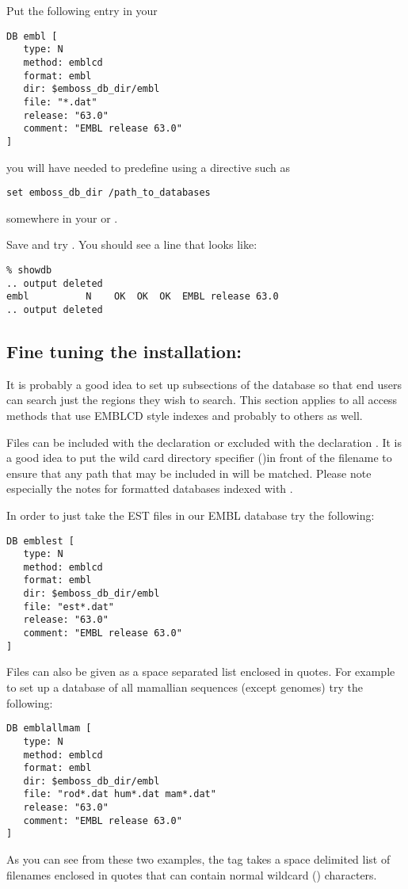 \documentclass{report}
\begin{document}
Put the following entry in your 
\begin{verbatim}
DB embl [
   type: N
   method: emblcd
   format: embl
   dir: $emboss_db_dir/embl
   file: "*.dat"
   release: "63.0"
   comment: "EMBL release 63.0"
]
\end{verbatim}
you will have needed to predefine  using a directive such as 
\begin{verbatim}
set emboss_db_dir /path_to_databases
\end{verbatim} 
somewhere in your  or .

Save  and try . You should see a line that looks like:
\begin{verbatim}
% showdb
.. output deleted
embl          N    OK  OK  OK  EMBL release 63.0
.. output deleted
\end{verbatim}

\subsection{Fine tuning the installation:}
\label{sec:finetune}
It is probably a good idea to set up subsections of the database so that end users can search just the regions they wish to search. This section applies to all access methods that use EMBLCD style indexes and probably to others as well.

Files can be included with the declaration  or excluded with the declaration . It is a good idea to put the wild card directory specifier (\filename{*/})in front of the filename to ensure that any path that may be included in  will be matched. Please note especially the notes for  formatted databases indexed with .  

In order to just take the EST files in our EMBL database try the following:
\begin{verbatim}
DB emblest [
   type: N
   method: emblcd
   format: embl
   dir: $emboss_db_dir/embl
   file: "est*.dat"
   release: "63.0"
   comment: "EMBL release 63.0"
]
\end{verbatim}
Files can also be given as a space separated list enclosed in quotes. For example to set up a database of all mamallian sequences (except genomes) try the following:
\begin{verbatim}
DB emblallmam [
   type: N
   method: emblcd
   format: embl
   dir: $emboss_db_dir/embl
   file: "rod*.dat hum*.dat mam*.dat"
   release: "63.0"
   comment: "EMBL release 63.0"
]
\end{verbatim}
As you can see from these two examples, the  tag takes a space delimited list of filenames enclosed in quotes that can contain normal wildcard () characters.
\end{document}
